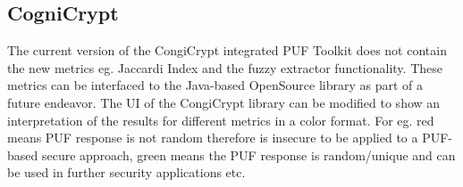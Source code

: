 \subsection{CogniCrypt}
The current version of the CongiCrypt integrated PUF Toolkit does not contain the new metrics eg. Jaccardi Index and the fuzzy extractor functionality. These metrics can be interfaced to the Java-based OpenSource library as part of a future endeavor. The UI of the CongiCrypt library can be modified to show an interpretation of the results for different metrics in a color format. For eg. red means PUF response is not random therefore is insecure to be applied to a PUF-based secure approach, green means the PUF
response is random/unique and can be used in further security applications etc.\\




